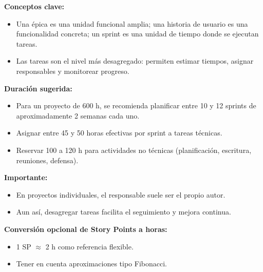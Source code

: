 \documentclass[
11pt, %
codirector, %
]{charter}
\begin{document}
\textbf{Conceptos clave:}
\begin{itemize}
  \item Una \'{e}pica es una unidad funcional amplia; una historia de usuario es una funcionalidad concreta; un sprint es una unidad de tiempo donde se ejecutan tareas.
  \item Las tareas son el nivel más desagregado: permiten estimar tiempos, asignar responsables y monitorear progreso.
\end{itemize}

\textbf{Duración sugerida:}
\begin{itemize}
  \item Para un proyecto de 600 h, se recomienda planificar entre 10 y 12 sprints de aproximadamente 2 semanas cada uno.
  \item Asignar entre 45 y 50 horas efectivas por sprint a tareas técnicas.
  \item Reservar 100 a 120 h para actividades no técnicas (planificación, escritura, reuniones, defensa).
\end{itemize}

\textbf{Importante:}
\begin{itemize}
  \item En proyectos individuales, el responsable suele ser el propio autor.
  \item Aun así, desagregar tareas facilita el seguimiento y mejora continua.
\end{itemize}

\textbf{Conversión opcional de Story Points a horas:}
\begin{itemize}
  \item 1 SP \(\approx\) 2 h como referencia flexible.
  \item Tener en cuenta aproximaciones tipo Fibonacci.
\end{itemize}
\end{document}
